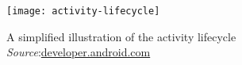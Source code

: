 %
%


\begin{frame}[plain]

  \begin{figure}
    \centering
    \texttt{[image: activity-lifecycle]}
    \caption{A simplified illustration of the activity lifecycle \\
      \emph{Source}:\url{developer.android.com}}
    \label{fig:android-lifecycle}
  \end{figure}
  
\end{frame}


